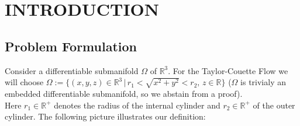 \documentclass[12pt,a4paper]{report}
\begin{document}
\vspace{2cm}
\begin{center}
\end{center}


\newpage

\chapter{INTRODUCTION}
\section{Problem Formulation}
Consider a differentiable submanifold \(\Omega\) of \(\mathbb{R}^3\). For the Taylor-Couette Flow we will choose \(\Omega := \{(x,y,z) \in \mathbb{R}^3 \, | \, r_1 < \sqrt{x^2 + y^2} < r_2, \,z \in \mathbb{R}\}\) (\(\Omega\) is trivialy an embedded differentiable submanifold, so we abstain from a proof).\\
Here \(r_1 \in \mathbb{R}^+\) denotes the radius of the internal cylinder and \(r_2 \in \mathbb{R}^+\) of the outer cylinder. The following picture illustrates our definition:\\
\end{document}
